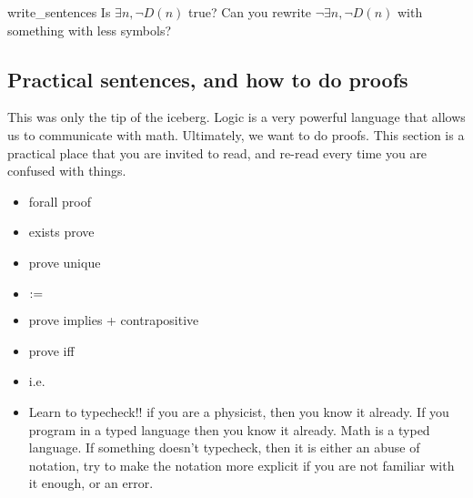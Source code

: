 \begin{cex}{}{write_sentences}
    Is \( \exists n, \neg D(n) \) true? Can you rewrite \( \neg \exists n, \neg D(n) \) with something with less symbols?
\end{cex}


\subsection{Practical sentences, and how to do proofs}

This was only the tip of the iceberg. Logic is a very powerful language that allows us to communicate with math. Ultimately, we want to do proofs. This section is a practical place that you are invited to read, and re-read every time you are confused with things. 


\begin{itemize}
    \item forall proof
    \item exists prove
    \item prove unique
    \item \( := \)
    \item prove implies + contrapositive
    \item prove iff 
    \item i.e.
    \item Learn to typecheck!! if you are a physicist, then you know it already. If you program in a typed language then you know it already. Math is a typed language. If something doesn't typecheck, then it is either an abuse of notation, try to make the notation more explicit if you are not familiar with it enough, or an error.
\end{itemize}

